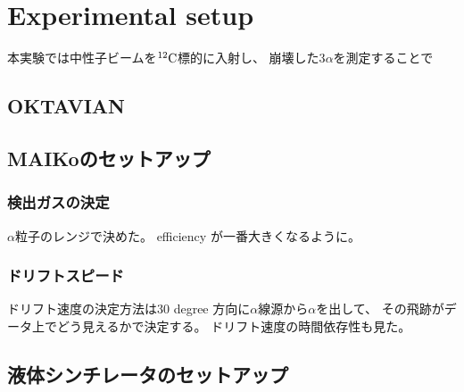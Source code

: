 \chapter{Experimental setup}
本実験では中性子ビームを${}^{12}\rm{C}$標的に入射し、
崩壊した3$\alpha$を測定することで
\section{OKTAVIAN}
\section{MAIKoのセットアップ}
\subsection{検出ガスの決定}
$\alpha$粒子のレンジで決めた。
efficiency が一番大きくなるように。
\subsection{ドリフトスピード}
ドリフト速度の決定方法は30 degree 方向に$\alpha$線源から$\alpha$を出して、
その飛跡がデータ上でどう見えるかで決定する。
ドリフト速度の時間依存性も見た。
\section{液体シンチレータのセットアップ}
